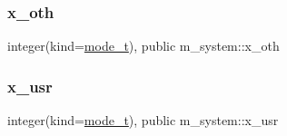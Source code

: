 \subsubsection{\texorpdfstring{x\+\_\+oth}{x\_oth}}
{\footnotesize\ttfamily integer(kind=\mbox{\hyperlink{namespacem__system_abdb5cc27c945379d844db4830d499050}{mode\+\_\+t}}), public m\+\_\+system\+::x\+\_\+oth}

\mbox{\label{namespacem__system_a450a3fddafad75b241f370b47b17d97c}} 
\subsubsection{\texorpdfstring{x\+\_\+usr}{x\_usr}}
{\footnotesize\ttfamily integer(kind=\mbox{\hyperlink{namespacem__system_abdb5cc27c945379d844db4830d499050}{mode\+\_\+t}}), public m\+\_\+system\+::x\+\_\+usr}

